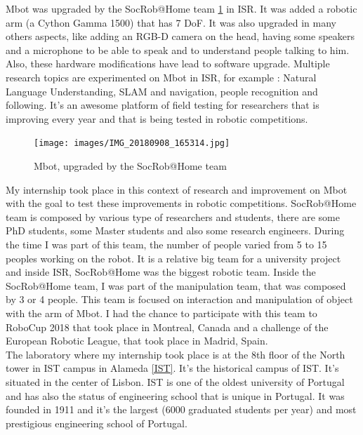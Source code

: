 Mbot was upgraded by the SocRob@Home team \ref{Mbot_upgraded} in \gls{ISR}. It was added a robotic arm (a Cython Gamma 1500) that has 7 \gls{DoF}. It was also upgraded in many others aspects, like adding an RGB-D camera on the head, having some speakers and a microphone to be able to speak and to understand people talking to him. Also, these hardware modifications have lead to software upgrade. Multiple research topics are experimented on Mbot in \gls{ISR}, for example : Natural Language Understanding, SLAM and navigation, people recognition and following. It's an awesome platform of field testing for researchers that is improving every year and that is being tested in robotic competitions. \\[0.05cm]

\begin{figure} [!h]
    \centering
    \texttt{[image: images/IMG\_20180908\_165314.jpg]}
    \caption{Mbot, upgraded by the SocRob@Home team}
    \label{Mbot_upgraded}
\end{figure}


My internship took place in this context of research and improvement on Mbot with the goal to test these improvements in robotic competitions. SocRob@Home team is composed by various type of researchers and students, there are some PhD students, some Master students and also some research engineers. During the time I was part of this team, the number of people varied from 5 to 15 peoples working on the robot. It is a relative big team for a university project and inside ISR, SocRob@Home was the biggest robotic team. Inside the SocRob@Home team, I was part of the manipulation team, that was composed by 3 or 4 people. This team is focused on interaction and manipulation of object with the arm of Mbot. I had the chance to participate with this team to RoboCup 2018 that took place in Montreal, Canada and a challenge of the European Robotic League, that took place in Madrid, Spain.\\[0.1cm]

The laboratory where my internship took place is at the 8th floor of the North tower in IST campus in Alameda \ref{IST}. It's the historical campus of IST. It's situated in the center of Lisbon. IST is one of the oldest university of Portugal and has also the status of engineering school that is unique in Portugal. It was founded in 1911 and it's the largest (6000 graduated students per year) and most prestigious engineering school of Portugal. \\[0.3cm]

